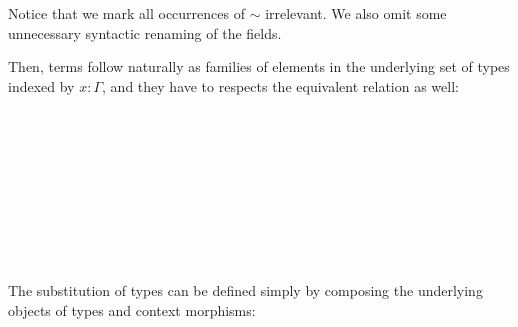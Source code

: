 Notice that we mark all occurrences of $\sim$ irrelevant. We also omit some unnecessary syntactic renaming of the fields.

Then, terms follow naturally as families of elements in the underlying set of types indexed by $x : \Gamma$,  and they have to respects the equivalent relation as well:


\begin{code}\>\<%
\\
\>  \AgdaSymbol{\{} \AgdaSymbol{:} \AgdaSymbol{\}(} \AgdaSymbol{:}  \AgdaSymbol{)} \AgdaSymbol{:}  \<%
\\
\>[0]\<[2]%
\>[2] \<%
\\
\>[0]\<[2]%
\>[2]\<%
\\
\>[2]\<[4]%
\>[4] \<[10]%
\>[10]\AgdaSymbol{:} \AgdaSymbol{(} \AgdaSymbol{:}   \AgdaSymbol{)}   \AgdaFunction{[}  \AgdaFunction{]fm}  \<%
\\
\>[2]\<[4]%
\>[4] \AgdaSymbol{:}  \AgdaSymbol{\{}  \AgdaSymbol{:}   \AgdaSymbol{\}}  \<[31]%
\>[31]\<%
\\
\>[4]\<[10]%
\>[10]\AgdaSymbol{(} \AgdaSymbol{:} \AgdaFunction{[}  \AgdaFunction{]}   \AgdaSymbol{)}  \<[30]%
\>[30]\<%
\\
\>[4]\<[10]%
\>[10]\AgdaFunction{[} \AgdaFunction{[}  \AgdaFunction{]fm}  \AgdaFunction{]} \AgdaFunction{[}  \AgdaFunction{]subst}  \AgdaSymbol{(} \AgdaSymbol{)}   \<%
\\
\>\<\end{code}



The substitution of types can be defined simply by composing the underlying objects of types and context morphisms:


